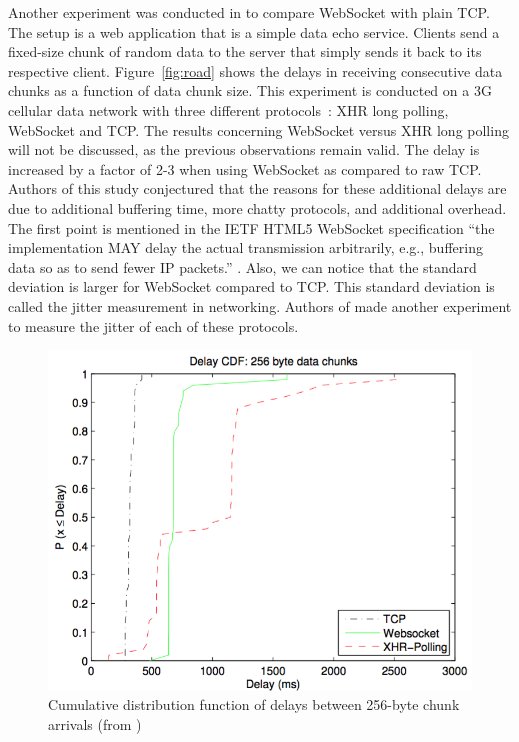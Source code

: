 \documentclass[10pt,journal,compsoc]{IEEEtran}
\newcommand{\ws}{WebSocket}
\begin{document}
Another experiment was conducted in \cite{roadblock} to compare \ws{} with plain TCP.
The setup is a web application that is a simple data echo service.
Clients send a fixed-size chunk of random data to the server that simply sends it back to its respective client.
Figure~\ref{fig:road} shows the delays in receiving consecutive data chunks as a function of data chunk size. %
This experiment is conducted on a 3G cellular data network with three different \mbox{protocols :} XHR long polling, \ws{} and TCP.
The results concerning \ws{} versus XHR long polling will not be discussed, as the previous observations remain valid. %
The delay is increased by a factor of 2-3 when using \ws{} as compared to raw TCP. %
Authors of this study conjectured that the reasons for these additional delays are due to additional buffering time, more chatty protocols, and additional overhead.
The first point is mentioned in the IETF HTML5 \ws{} specification ``the implementation MAY delay the actual transmission arbitrarily, e.g., buffering data so as to send fewer IP packets.'' \cite{rfc6455}.
Also, we can notice that the standard deviation is larger for \ws{} compared to TCP.
This standard deviation is called the jitter measurement in networking.
Authors of \cite{roadblock} made another experiment to measure the jitter of each of these protocols.
\begin{figure}[!ht]
    \centering
    \includegraphics[width=\linewidth]{road_jitter.png}
    \caption{Cumulative distribution function of delays between 256-byte chunk arrivals (from \cite{roadblock})}
    \label{fig:road2}
\end{figure}
\end{document}
